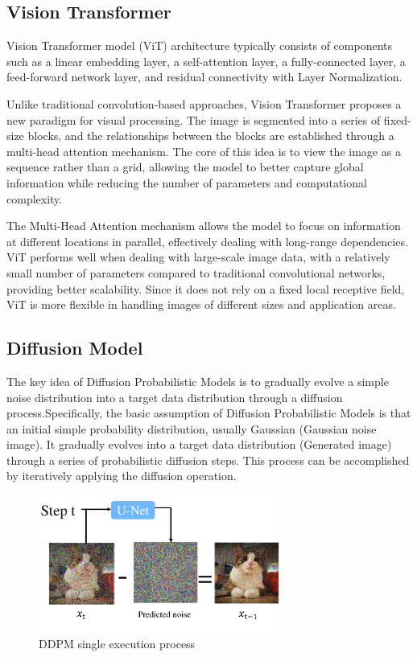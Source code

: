 \documentclass{acsman}
\begin{document}
\subsection{Vision Transformer}
Vision Transformer model (ViT) \cite{dosovitskiy2020image} architecture typically consists of components such as a linear embedding layer, a self-attention layer, a fully-connected layer, a feed-forward network layer, and residual connectivity with Layer Normalization.

Unlike traditional convolution-based approaches, Vision Transformer proposes a new paradigm for visual processing. The image is segmented into a series of fixed-size blocks, and the relationships between the blocks are established through a multi-head attention mechanism. The core of this idea is to view the image as a sequence rather than a grid, allowing the model to better capture global information while reducing the number of parameters and computational complexity.

The Multi-Head Attention mechanism allows the model to focus on information at different locations in parallel, effectively dealing with long-range dependencies. ViT performs well when dealing with large-scale image data, with a relatively small number of parameters compared to traditional convolutional networks, providing better scalability. Since it does not rely on a fixed local receptive field, ViT is more flexible in handling images of different sizes and application areas.

\subsection{Diffusion Model}
The key idea of Diffusion Probabilistic Models \cite{ho2020denoising} is to gradually evolve a simple noise distribution into a target data distribution through a diffusion process.Specifically, the basic assumption of Diffusion Probabilistic Models is that an initial simple probability distribution, usually Gaussian (Gaussian noise image). It gradually evolves into a target data distribution (Generated image) through a series of probabilistic diffusion steps. This process can be accomplished by iteratively applying the diffusion operation. 
\begin{figure}[h]
    \centering
    \includegraphics[width=8cm]{image/DDPM.pdf}
    \caption{DDPM single execution process}
    \label{fig:DDPM}
\end{figure}
\end{document}
